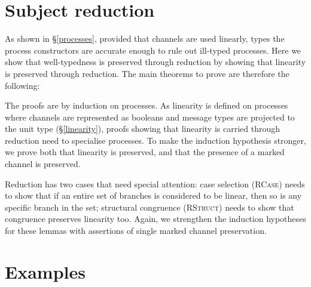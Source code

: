 \documentclass{mproj}
\begin{document}

\section{Subject reduction}\label{subject-reduction}

As shown in \S \ref{processes}, provided that channels are used linearly, types the process constructors are accurate enough to rule out ill-typed processes. Here we show that well-typedness is preserved through reduction by showing that linearity is preserved through reduction. The main theorems to prove are therefore the following:



The proofs are by induction on processes. As linearity is defined on processes where channels are represented as booleans and message types are projected to the unit type (\S \ref{linearity}), proofs showing that linearity is carried through reduction need to specialise processes. To make the induction hypothesis stronger, we prove both that linearity is preserved, and that the presence of a marked channel is preserved.


Reduction has two cases that need special attention: case selection (\textsc{RCase}) needs to show that if an entire set of branches is considered to be linear, then so is any specific branch in the set; structural congruence (\textsc{RStruct}) needs to show that congruence preserves linearity too. Again, we strengthen the induction hypotheses for these lemmas with assertions of single marked channel preservation.



\section{Examples}\label{examples}

\end{document}

